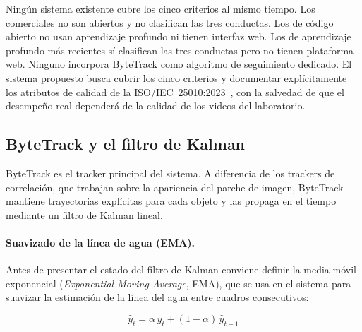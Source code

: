 Ningún sistema existente cubre los cinco criterios al mismo tiempo.
Los comerciales no son abiertos y no clasifican las tres conductas. Los de
código abierto no usan aprendizaje profundo ni tienen interfaz web. Los de
aprendizaje profundo más recientes sí clasifican las tres conductas pero no
tienen plataforma web. Ninguno incorpora ByteTrack como algoritmo de
seguimiento dedicado. El sistema propuesto busca cubrir los cinco criterios
y documentar explícitamente los atributos de calidad de la
ISO/IEC~25010:2023~\cite{iso25010}, con la salvedad de que el desempeño real
dependerá de la calidad de los videos del laboratorio.


%
%

\subsection{ByteTrack y el filtro de Kalman}
\label{subsec:bytetrack_kalman}

ByteTrack \cite{zhang2022_bytetrack} es el tracker principal del sistema.
A diferencia de los trackers de correlación, que trabajan sobre la apariencia
del parche de imagen, ByteTrack mantiene trayectorias explícitas para cada
objeto y las propaga en el tiempo mediante un filtro de Kalman lineal.

\paragraph{Suavizado de la línea de agua (EMA).}
Antes de presentar el estado del filtro de Kalman conviene definir la
media móvil exponencial (\textit{Exponential Moving Average}, EMA), que se
usa en el sistema para suavizar la estimación de la línea del agua entre
cuadros consecutivos:

\begin{equation}
    \hat{y}_t = \alpha\,y_t + (1-\alpha)\,\hat{y}_{t-1}
    \label{eq:ema}
\end{equation}

